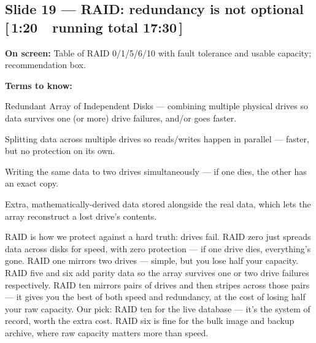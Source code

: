 \documentclass[11pt]{article}
\newcommand{\onscreen}[1]{\noindent\textbf{\color{sovGrey}On screen:} #1\par\vspace{4pt}}
\newcommand{\timing}[2]{\hfill{\normalsize\color{sovGrey}[\,#1\ \textbar\ running total #2\,]}}
\newenvironment{terms}
  {\noindent\textbf{\color{sovGrey}Terms to know:}
   \begin{description}[leftmargin=0pt,style=sameline,labelindent=0pt,itemsep=2pt,topsep=2pt,font=\normalfont\bfseries\color{sovDark}]}
  {\end{description}\vspace{2pt}}
\begin{document}
\subsection*{Slide 19 --- RAID: redundancy is not optional \timing{1:20}{17:30}}
\onscreen{Table of RAID 0/1/5/6/10 with fault tolerance and usable capacity; recommendation
box.}
\begin{terms}
  \item[RAID] Redundant Array of Independent Disks --- combining multiple physical
    drives so data survives one (or more) drive failures, and/or goes faster.
  \item[Striping] Splitting data across multiple drives so reads/writes happen in
    parallel --- faster, but no protection on its own.
  \item[Mirroring] Writing the same data to two drives simultaneously --- if one dies,
    the other has an exact copy.
  \item[Parity] Extra, mathematically-derived data stored alongside the real data,
    which lets the array reconstruct a lost drive's contents.
\end{terms}
\begin{sayit}
RAID is how we protect against a hard truth: drives fail. RAID zero just spreads data
across disks for speed, with zero protection --- if one drive dies, everything's gone.
RAID one mirrors two drives --- simple, but you lose half your capacity. RAID five and
six add parity data so the array survives one or two drive failures respectively. RAID
ten mirrors pairs of drives and then stripes across those pairs --- it gives you the best
of both speed and redundancy, at the cost of losing half your raw capacity. Our pick:
RAID ten for the live database --- it's the system of record, worth the extra cost.
RAID six is fine for the bulk image and backup archive, where raw capacity matters more
than speed.
\end{sayit}
\end{document}
